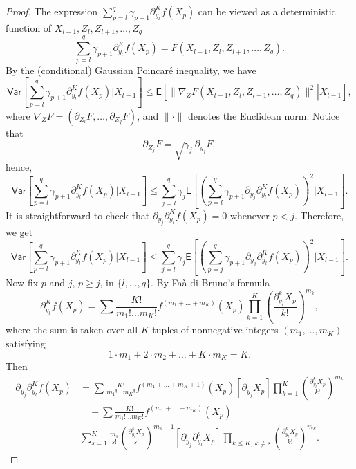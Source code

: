 \documentclass[article]{elsarticle}
\begin{document}
\begin{proof}
The expression
$\sum_{p=l}^q \gamma_{p+1} \partial_{y_l}^K f(X_p)$
can be viewed as a deterministic function of
$X_{l-1},Z_l,Z_{l+1},\ldots,Z_q$
$$
\sum_{p=l}^q \gamma_{p+1} \partial_{y_l}^K f(X_p)
=F(X_{l-1},Z_l,Z_{l+1},\ldots,Z_q).
$$
By the (conditional) Gaussian Poincar\'e inequality,
we have
$$
\mathsf{Var}\left[\sum_{p=l}^{q}\gamma_{p+1}\partial_{y_{l}}^{K}f\left(X_{p}\right)\Big|X_{l-1}\right]
\le\mathsf E\left[\left.
\|\nabla_Z F(X_{l-1},Z_l,Z_{l+1},\ldots,Z_q)\|^2
\right|X_{l-1}\right],
$$
where $\nabla_Z F=(\partial_{Z_l} F,\ldots,\partial_{Z_q} F)$,
and $\|\cdot\|$ denotes the Euclidean norm.
Notice that
$$
\partial_{Z_j} F=\sqrt{\gamma_j}\,\partial_{y_j} F,
$$
hence,
$$
\mathsf{Var}\left[\sum_{p=l}^{q}\gamma_{p+1}\partial_{y_{l}}^{K}f\left(X_{p}\right)\Big|X_{l-1}\right]\leq\sum_{j=l}^{q}\gamma_{j}\mathsf{E}\left[\left(\sum_{p=l}^{q}\gamma_{p+1}\partial_{y_{j}}\partial_{y_{l}}^{K}f\left(X_{p}\right)\right)^{2}\Big|X_{l-1}\right].
$$
It is straightforward to check that
$\partial_{y_j}\partial_{y_l}^K f(X_p)=0$
whenever $p<j$. Therefore, we get
\begin{equation}\label{eq:10062018a2}
\mathsf{Var}\left[\sum_{p=l}^{q}\gamma_{p+1}\partial_{y_{l}}^{K}f\left(X_{p}\right)\Big|X_{l-1}\right]\leq\sum_{j=l}^{q}\gamma_{j}\mathsf{E}\left[\left(\sum_{p=j}^{q}\gamma_{p+1}\partial_{y_{j}}\partial_{y_{l}}^{K}f\left(X_{p}\right)\right)^{2}\Big|X_{l-1}\right].
\end{equation}
Now fix $p$ and $j$, $p\ge j$, in $\{l,\ldots,q\}$.
By Fa\`a di Bruno's formula
\[
\partial_{y_{l}}^{K}f\left(X_{p}\right)=\sum\frac{K!}{m_{1}!\ldots m_{K}!}f^{(m_{1}+\ldots+m_{K})}(X_{p})\prod_{k=1}^{K}\left(\frac{\partial_{y_{l}}^{k}X_{p}}{k!}\right)^{m_{k}},
\]
where the sum is taken over all $K$-tuples of nonnegative integers
$(m_1,\ldots,m_K)$ satisfying
$$
1\cdot m_{1}+2\cdot m_{2}+\ldots+K\cdot m_{K}=K.
$$
Then
\begin{align*}
\partial_{y_{j}}\partial_{y_{l}}^{K}f\left(X_{p}\right)
&=\sum\frac{K!}{m_{1}!\ldots m_{K}!}f^{(m_{1}+\ldots+m_{K}+1)}(X_{p})\left[\partial_{y_{j}}X_{p}\right]\prod_{k=1}^{K}\left(\frac{\partial_{y_{l}}^{k}X_{p}}{k!}\right)^{m_{k}}
\\
&\hspace{1em}+\sum\frac{K!}{m_{1}!\ldots m_{K}!}f^{(m_{1}+\ldots+m_{K})}(X_{p})
\\
&\sum_{s=1}^{K}\frac{m_{s}}{s!}
\left(\frac{\partial_{y_{l}}^{s}X_{p}}{s!}\right)^{m_{s}-1}
\left[\partial_{y_{j}}\partial_{y_{l}}^{s}X_{p}\right]
\prod_{k\le K,\,k\neq s}\left(\frac{\partial_{y_{l}}^{k}X_{p}}{k!}\right)^{m_{k}}.

\end{align*}
\end{proof}
\end{document}
